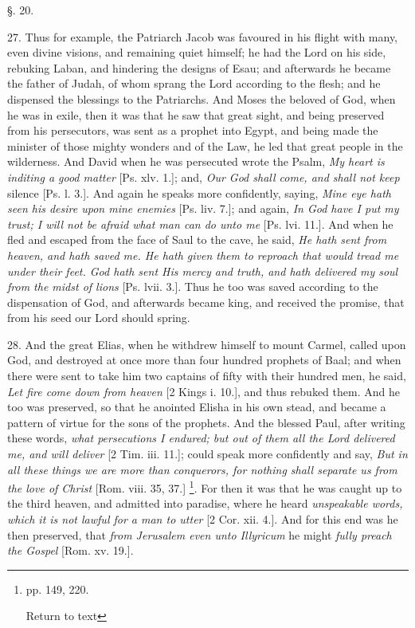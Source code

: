 §. 20.

27. Thus for example, the Patriarch Jacob was
favoured in his flight with many, even divine visions, and remaining
quiet himself; he had the Lord on his side, rebuking Laban, and
hindering the designs of Esau; and afterwards he became the father of
Judah, of whom sprang the Lord according to the flesh; and he
dispensed the blessings to the Patriarchs. And Moses the beloved of
God, when he was in exile, then it was that he saw that great sight,
and being preserved from his persecutors, was sent as a prophet into
Egypt, and being made the minister of those mighty wonders and of the
Law, he led that great people in the wilderness. And David when he was
persecuted wrote the Psalm, \emph{My heart is inditing a good matter}
[Ps. xlv. 1.]; and, \emph{Our God shall come, and shall not keep}
silence [Ps. l. 3.]. And again he speaks more confidently,
saying, \emph{Mine eye hath seen his desire upon mine enemies} [Ps.
liv. 7.]; and again, \emph{In God have I put my trust; I will not be
afraid what man can do unto me} [Ps. lvi. 11.]. And when he fled
and escaped from the face of Saul to the cave, he said, \emph{He hath
sent from heaven, and hath saved me. He hath given them to reproach
that would tread me under their feet. God hath sent His mercy and
truth, and hath delivered my soul from the midst of lions} [Ps.
lvii. 3.]. Thus he too was saved according to the dispensation of God,
and afterwards became king, and received the promise, that from his
seed our Lord should spring.

28. And the great Elias, when he withdrew himself
to mount Carmel, called upon God, and destroyed at once more than four
hundred prophets of Baal; and when there were sent to take him two
captains of fifty with their hundred men, he said, \emph{Let fire come
down from heaven} [2 Kings i. 10.], and thus rebuked them. And he
too was preserved, so that he anointed Elisha in his own stead, and
became a pattern of virtue for the sons of the prophets. And the
blessed Paul, after writing these words, \emph{what persecutions I
endured; but out of them all the Lord delivered me, and will deliver}
[2 Tim. iii. 11.]; could speak more confidently and say, \emph{But in all
these things we are more than conquerors, for nothing shall separate
us from the love of Christ} [Rom. viii. 35, 37.] \footnote{pp. 149, 220.

Return to text}. For then it was that he was caught up to the third heaven, and
admitted into paradise, where he heard \emph{unspeakable words, which it
is not lawful for a man to utter} [2 Cor. xii. 4.]. And for this
end was he then preserved, that \emph{from Jerusalem even unto Illyricum}
he might \emph{fully preach the Gospel} [Rom. xv. 19.].


